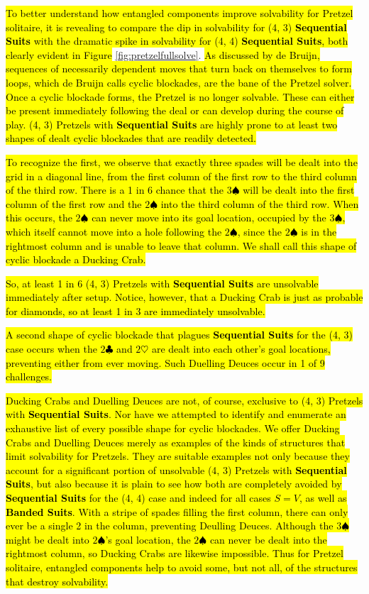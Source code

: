 \documentclass[journal]{IEEEtran}
\begin{document}
\hl{To better understand how entangled components improve solvability for Pretzel solitaire, it is revealing to compare the dip in solvability for (4, 3) \textbf{Sequential Suits} with the dramatic spike in solvability for (4, 4) \textbf{Sequential Suits}, both clearly evident in Figure} \ref{fig:pretzelfullsolve}. \hl{As discussed by de Bruijn, sequences of necessarily dependent moves that turn back on themselves to form loops, which de Bruijn calls cyclic blockades, are the bane of the Pretzel solver. Once a cyclic blockade forms, the Pretzel is no longer solvable. These can either be present immediately following the deal or can develop during the course of play. (4, 3) Pretzels with \textbf{Sequential Suits} are highly prone to at least two shapes of dealt cyclic blockades that are readily detected.}

\hl{To recognize the first, we observe that exactly three spades will be dealt into the grid in a diagonal line, from the first column of the first row to the third column of the third row. There is a 1 in 6 chance that the $3\spadesuit$ will be dealt into the first column of the first row and the $2\spadesuit$ into the third column of the third row. When this occurs, the $2\spadesuit$ can never move into its goal location, occupied by the $3\spadesuit$, which itself cannot move into a hole following the $2\spadesuit$, since the $2\spadesuit$ is in the rightmost column and is unable to leave that column. We shall call this shape of cyclic blockade a Ducking Crab.}

\hl{So, at least 1 in 6 (4, 3) Pretzels with \textbf{Sequential Suits} are unsolvable immediately after setup. Notice, however, that a Ducking Crab is just as probable for diamonds, so at least 1 in 3 are immediately unsolvable.}

\hl{A second shape of cyclic blockade that plagues \textbf{Sequential Suits} for the (4, 3) case occurs when the $2\clubsuit$ and $2\heartsuit$ are dealt into each other's goal locations, preventing either from ever moving. Such Duelling Deuces occur in 1 of 9 challenges.}

\hl{Ducking Crabs and Duelling Deuces are not, of course, exclusive to (4, 3) Pretzels with \textbf{Sequential Suits}. Nor have we attempted to identify and enumerate an exhaustive list of every possible shape for cyclic blockades. We offer Ducking Crabs and Duelling Deuces merely as examples of the kinds of structures that limit solvability for Pretzels. They are suitable examples not only because they account for a significant portion of unsolvable (4, 3) Pretzels with \textbf{Sequential Suits}, but also because it is plain to see how both are completely avoided by \textbf{Sequential Suits} for the (4, 4) case and indeed for all cases $S = V$, as well as \textbf{Banded Suits}. With a stripe of spades filling the first column, there can only ever be a single 2 in the column, preventing Deulling Deuces. Although the $3\spadesuit$ might be dealt into $2\spadesuit$'s goal location, the $2\spadesuit$ can never be dealt into the rightmost column, so Ducking Crabs are likewise impossible. Thus for Pretzel solitaire, entangled components help to avoid some, but not all, of the structures that destroy solvability.}
\end{document}
